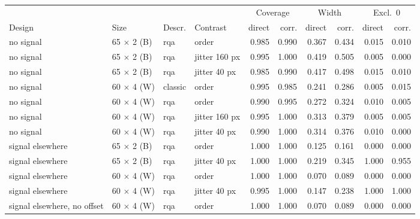 \begin{tabular}{llllrrrrrr}
\toprule
 & & & & \multicolumn{2}{c}{Coverage} & \multicolumn{2}{c}{Width} & \multicolumn{2}{c}{Excl.\ 0} \\
\cmidrule(lr){5-6}\cmidrule(lr){7-8}\cmidrule(lr){9-10}
Design & Size & Descr. & Contrast & direct & corr. & direct & corr. & direct & corr. \\
\midrule
no signal & 65 $\times$ 2 (B) & rqa & order & 0.985 & 0.990 & 0.367 & 0.434 & 0.015 & 0.010 \\
no signal & 65 $\times$ 2 (B) & rqa & jitter 160 px & 0.995 & 1.000 & 0.419 & 0.505 & 0.005 & 0.000 \\
no signal & 65 $\times$ 2 (B) & rqa & jitter 40 px & 0.985 & 0.990 & 0.417 & 0.498 & 0.015 & 0.010 \\
no signal & 60 $\times$ 4 (W) & classic & order & 0.995 & 0.985 & 0.241 & 0.286 & 0.005 & 0.015 \\
no signal & 60 $\times$ 4 (W) & rqa & order & 0.990 & 0.995 & 0.272 & 0.324 & 0.010 & 0.005 \\
no signal & 60 $\times$ 4 (W) & rqa & jitter 160 px & 0.995 & 1.000 & 0.313 & 0.379 & 0.005 & 0.005 \\
no signal & 60 $\times$ 4 (W) & rqa & jitter 40 px & 0.990 & 1.000 & 0.314 & 0.376 & 0.010 & 0.000 \\
signal elsewhere & 65 $\times$ 2 (B) & rqa & order & 1.000 & 1.000 & 0.125 & 0.161 & 0.000 & 0.000 \\
signal elsewhere & 65 $\times$ 2 (B) & rqa & jitter 40 px & 1.000 & 1.000 & 0.219 & 0.345 & 1.000 & 0.955 \\
signal elsewhere & 60 $\times$ 4 (W) & rqa & order & 1.000 & 1.000 & 0.070 & 0.089 & 0.000 & 0.000 \\
signal elsewhere & 60 $\times$ 4 (W) & rqa & jitter 40 px & 0.995 & 1.000 & 0.147 & 0.238 & 1.000 & 1.000 \\
signal elsewhere, no offset & 60 $\times$ 4 (W) & rqa & order & 1.000 & 1.000 & 0.070 & 0.089 & 0.000 & 0.000 \\
\bottomrule
\end{tabular}
